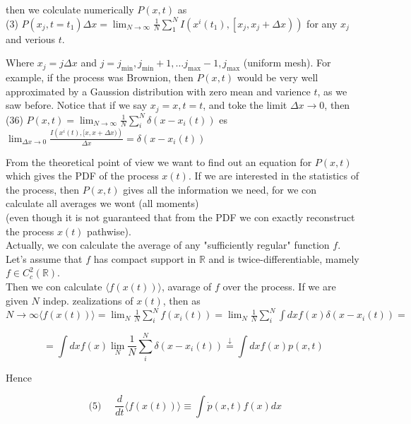 \documentclass[10pt]{article}
\begin{document}
then we colculate numerically $P(x, t)$ as\\
(3) $P\left(x_{j}, t=t_{1}\right) \Delta x=\lim _{N \rightarrow \infty} \frac{1}{N} \sum_{1}^{N} I\left(x^{i}\left(t_{1}\right),\left[x_{j}, x_{j}+\Delta x\right)\right)$ for any $x_{j}$ and verious $t$.

Where $x_{j}=j \Delta x$ and $j=j_{\min }, j_{\min }+1, \ldots j_{\max }-1, j_{\max }$ (uniform mesh). For example, if the process was Brownion, then $P(x, t)$ would be very well approximated by a Gaussion distribution with zero mean and varience $t$, as we saw before. Notice that if we say $x_{j}=x, t=t$, and toke the limit $\Delta x \rightarrow 0$, then\\
(36) $P(x, t)=\lim _{N \rightarrow \infty} \frac{1}{N} \sum_{i}^{N} \delta\left(x-x_{i}(t)\right)$ es $\lim _{\Delta x \rightarrow 0} \frac{I\left(x^{i}(t),[x, x+\Delta x)\right)}{\Delta x}=\delta\left(x-x_{i}(t)\right)$

From the theoretical point of view we want to find out an equation for $P(x, t)$ which gives the PDF of the process $x(t)$. If we are interested in the statistics of the process, then $P(x, t)$ gives all the information we need, for we con\\
calculate all averages we wont (all moments)\\
(even though it is not guaranteed that from the PDF we con exactly reconstruct the process $x(t)$ pathwise).\\
Actually, we con calculate the average of any "sufficiently regular" function $f$.\\
Let's assume that $f$ has compact support in $\mathbb{R}$ and is twice-differentiable, mamely $f \in C_{c}^{2}(\mathbb{R})$.\\
Then we con calculate $\langle f(x(t))\rangle$, avarage of $f$ over the process. If we are given $N$ indep. zealizations of $x(t)$, then as $N \rightarrow \infty \langle f(x(t))\rangle=\lim _{N} \frac{1}{N} \sum_{i}^{N} f\left(x_{i}(t)\right)=\lim _{N} \frac{1}{N} \sum_{i}^{N} \int d x f(x) \delta\left(x-x_{i}(t)\right)=$


\begin{equation*}
=\int d x f(x) \lim _{N} \frac{1}{N} \sum_{i}^{N} \delta\left(x-x_{i}(t)\right) \stackrel{\downarrow}{=} \int d x f(x) p(x, t) \tag{35}
\end{equation*}


Hence

$$
\text { (5) } \quad \frac{d}{d t}\langle f(x(t))\rangle \equiv \int \dot{p}(x, t) f(x) d x
$$
\end{document}
